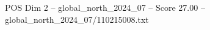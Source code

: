 \begin{textsample}{POS Dim 2 – global\_north\_2024\_07 – Score 27.00 – global\_north\_2024\_07/110215008.txt}
\end{textsample}
